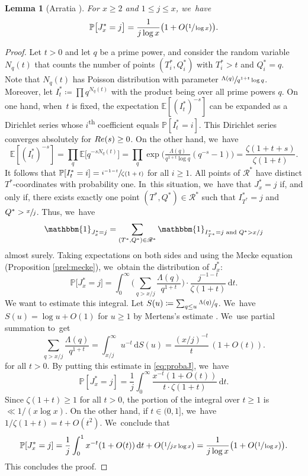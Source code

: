\documentclass[10pt,a4paper]{amsart}
\newcommand{\PP}{\mathbb{P}}
\newcommand{\EE}{\mathbb{E}}
\newcommand{\one}{\mathbbm{1}}
\newcommand{\RS}{\mathscr{R}}
\newcommand{\bigoo}[1]{O\!\left(#1 \right)}
\newcommand{\riemint}[4]{\int_{#1}^{#2}\! #3 \, \mathrm{d}#4}
\renewcommand{\Re}{\textup{Re}}
\newcommand{\bg}{\big}
\newcommand{\bgg}{\Big}
\theoremstyle{plain}
\newtheorem{lem}[cor]{Lemma}
\theoremstyle{definition}
\begin{document}
\begin{lem}[Arratia \cite{Arratia02}]
\label{lem:probaj}
For $x \ge 2$ and $1 \le j \le x$, we~have
\[
\PP\bg[J_x^*=j\bg] = \frac{1}{j\log x}\bigl(1+\bigoo{\sfrac{1}{\log x}} \bigr).
\]
\end{lem}

\begin{proof}
Let $t>0$ and let $q$ be a prime power, and consider the random variable $N_q(t)$ that counts the number of points $(T^*_i, Q^*_i)$ with $T^*_i > t$ and $Q^*_i = q$. Note that $N_q(t)$ has Poisson distribution with parameter $\sfrac{\Lambda(q)}{q^{1+t}\log q}$. Moreover, let $I^*_t \coloneqq \prod q^{N_q(t)}$ with the product being over all prime powers $q$. On one hand, when~$t$ is fixed, the expectation $\EE[(I^*_t)^{-s}]$ can be expanded as a Dirichlet series whose $i$\textsuperscript{th} coefficient equals $\PP[I^*_t = i]$. This Dirichlet series converges absolutely for $\Re(s)\ge0$. On the other hand, we~have
\[
\EE[(I^*_t)^{-s}] = \prod_q \EE\bg[q^{-sN_q(t)}\bg] = \prod_q \exp\!\bgg(\tfrac{\Lambda(q)}{q^{1+t}\log q} (q^{-s}-1)\bgg) = \frac{\zeta(1+t+s)}{\zeta(1+t)}.
\]
It follows that $\PP[I^*_t = i] = \sfrac{i^{-1-t}}{\zeta(1+t)}$ for all $i \ge 1$. All points of $\RS^*$ have distinct $T^*$-coordinates with probability one. In~this situation, we~have that $J_x^* = j$ if, and only if, there exists exactly one point $(T^*, Q^*) \in \RS^*$ such that $I^*_{T^*} = j$ and $Q^* > \sfrac{x}{j}$. Thus, we~have
\[
\one _{J_x^* = j} = \sum_{(T^*, Q^*) \in \RS^*} \one _{I^*_{T^*} = j \text{ and } Q^{*}> x/j}
\]
almost surely. Taking expectations on both sides and using the Mecke equation (Proposition \ref{prel:mecke}), we~obtain the distribution of $J_x^*$:
\begin{equation}
\label{eq:probaJ}
\PP\bg[J_x^*=j\bg]
= \riemint{0}{\infty}{\bigg(\sum_{q > x/j} \frac{\Lambda(q)}{q^{1+t}}\bigg)\cdot \frac{j^{-1-t}}{\zeta(1+t)}}{t}.
\end{equation}
We want to estimate this integral. Let $S(u) \coloneqq \sum_{q \le u} \sfrac{\Lambda(q)}{q}$. We~have $S(u) = \log u + O(1)$ for $u \ge 1$ by Mertens's estimate \cite[Th.\,3.4(a)]{Koukoulo19}. We~use partial summation to~get
\[
\sum_{q > x/j} \frac{\Lambda(q)}{q^{1+t}} = \riemint{x/j}{\infty}{u^{-t}}{S(u)} = \frac{(x/j)^{-t}}{t}\,(1+O(t)).
\]
for all $t > 0$. By putting this estimate in \eqref{eq:probaJ}, we~have
\[
\PP[J_x^* = j] = \frac{1}{j} \riemint{0}{\infty}{\frac{x^{-t}(1+O(t))}{t\cdot \zeta(1+t)}}{t}.
\]
Since $\zeta(1+t)\ge1$ for all $t>0$, the portion of the integral over $t\ge1$ is $\ll 1/(x\log x)$. On the other hand, if $t\in(0,1]$, we~have $1/\zeta(1+t)=t+O(t^2)$. We~conclude that
\[
\PP[J_x^* = j] = \frac{1}{j} \int_0^1 x^{-t}(1+O(t)) \,\mathrm dt + O(\sfrac{1}{jx\log x}) = \frac{1}{j\log x}\bg(1+O(\sfrac{1}{\log x})\bg).
\]
This concludes the proof.
\end{proof}
\end{document}
